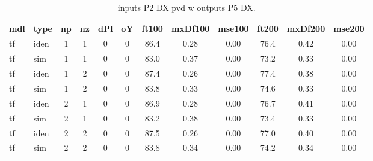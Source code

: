 \begin{center} 
\begin{longtable}{ll|cccc|ccc|ccc} 
\caption[inputs P2 DX pvd w   outputs P5 DX]{inputs P2 DX pvd w   outputs P5 DX.} 
\label{tab:inputs_P2_DX_pvd_w___outputs_P5_DX} 
\hline 
  mdl & type & np & nz & dPl & oY & ft100 & mxDf100 & mse100 & ft200 & mxDf200 & mse200 \\ 
 \hline 
tf  & iden & 1 & 1 & 0 & 0 & 86.4 & 0.28 & 0.00 & 76.4 & 0.42 & 0.00 \\ 
tf  & sim & 1 & 1 & 0 & 0 & 83.0 & 0.37 & 0.00 & 73.2 & 0.33 & 0.00 \\ 
 \hline 
tf  & iden & 1 & 2 & 0 & 0 & 87.4 & 0.26 & 0.00 & 77.4 & 0.38 & 0.00 \\ 
tf  & sim & 1 & 2 & 0 & 0 & 83.8 & 0.33 & 0.00 & 74.6 & 0.33 & 0.00 \\ 
 \hline 
tf  & iden & 2 & 1 & 0 & 0 & 86.9 & 0.28 & 0.00 & 76.7 & 0.41 & 0.00 \\ 
tf  & sim & 2 & 1 & 0 & 0 & 83.2 & 0.38 & 0.00 & 73.4 & 0.33 & 0.00 \\ 
 \hline 
tf  & iden & 2 & 2 & 0 & 0 & 87.5 & 0.26 & 0.00 & 77.0 & 0.40 & 0.00 \\ 
tf  & sim & 2 & 2 & 0 & 0 & 83.8 & 0.34 & 0.00 & 74.2 & 0.34 & 0.00 \\ 
 \hline 
\end{longtable} 
\end{center}